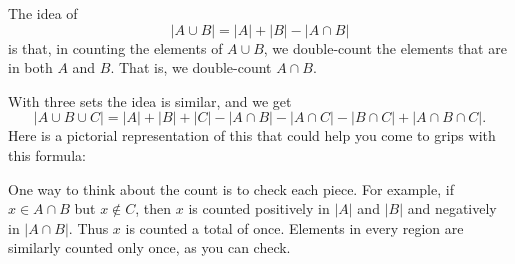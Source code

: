 \documentclass[12pt,letterpaper]{article}
\begin{document}
\newpage
{}%
\lhead{}
\rhead{}
\thispagestyle{fancy}

\begin{enumerate}
  \Answer The idea of 
  \begin{equation*}
    |A\cup B| = |A| + |B| - |A\cap B|
  \end{equation*}
  is that, in counting the elements of $A\cup B$, we double-count the
  elements that are in both $A$ and $B$.  That is, we double-count
  $A\cap B$.  

  With three sets the idea is similar, and we get 
  \begin{equation*}
    |A\cup B \cup C|
    = |A| + |B| + |C|
    - |A\cap B| - |A\cap C| - |B\cap C|
    + |A \cap B \cap C|.
  \end{equation*}
  Here is a pictorial representation of this that could help you come
  to grips with this formula:
  \newcommand{\firstcircle}{(0,0) circle (1.5)}
  \newcommand{\secondcircle}{(1,1.5) circle (1.5)}
  \newcommand{\thirdcircle}{(2,0) circle (1.5)}
  \begin{center}
  \end{center}
  One way to think about the count is to check each piece.  For
  example, if $x\in A\cap B$ but $x\not\in C$, then $x$ is counted
  positively in $|A|$ and $|B|$ and negatively in $|A\cap B|$.
  Thus $x$ is counted a total of once.  Elements in every region are
  similarly counted only once, as you can check.
  \bigskip


\end{enumerate}
\end{document}
